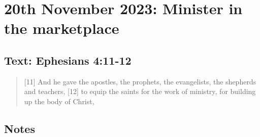 \setcounter{figure}{0}

\section{20th November 2023: Minister in the marketplace}
\subsection*{Text: Ephesians 4:11-12}
  \begin{quote}
    [11] And he gave the apostles, the prophets, the evangelists, the shepherds and teachers, [12] to equip the saints for the work of ministry, for building up the body of Christ,
  \end{quote}
\subsection*{Notes}
